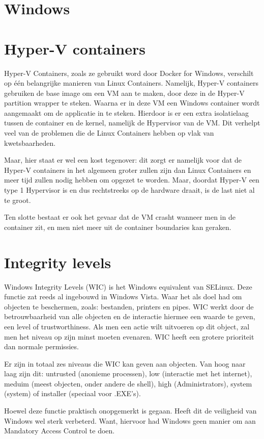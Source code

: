 \section{Windows}
\section{Hyper-V containers}
Hyper-V Containers, zoals ze gebruikt word door Docker for Windows, verschilt op één belangrijke manieren van Linux Containers. Namelijk, Hyper-V containers gebruiken de base image om een VM aan te maken, door deze in de Hyper-V partition wrapper te steken. Waarna er in deze VM een Windows container wordt aangemaakt om de applicatie in te steken. Hierdoor is er een extra isolatielaag tussen de container en de kernel, namelijk de Hypervisor van de VM. Dit verhelpt veel van de problemen die de Linux Containers hebben op vlak van kwetsbaarheden.

Maar, hier staat er wel een kost tegenover: dit zorgt er namelijk voor dat de Hyper-V containers in het algemeen groter zullen zijn dan Linux Containers en meer tijd zullen nodig hebben om opgezet te worden. Maar, doordat Hyper-V een type 1 Hypervisor is en dus rechtstreeks op de hardware draait, is de last niet al te groot.

Ten slotte bestaat er ook het gevaar dat de VM crasht wanneer men in de container zit, en men niet meer uit de container boundaries kan geraken.

\section{Integrity levels}
Windows Integrity Levels (WIC) is het Windows equivalent van SELinux. Deze functie zat reeds al ingebouwd in Windows Vista. Waar het als doel had om objecten te beschermen, zoals: bestanden, printers en pipes. WIC werkt door de betrouwbaarheid van alle objecten en de interactie hiermee een waarde te geven, een level of trustworthiness. Als men een actie wilt uitvoeren op dit object, zal men het niveau op zijn minst moeten evenaren. WIC heeft een grotere prioriteit dan normale permissies.

Er zijn in totaal zes niveaus die WIC kan geven aan objecten. Van hoog naar laag zijn dit: untrusted (anonieme processen), low (interactie met het internet), meduim (meest objecten, onder andere de shell), high (Administrators), system (system) of installer (speciaal voor .EXE's).

Hoewel deze functie praktisch onopgemerkt is gegaan. Heeft dit de veiligheid van Windows wel sterk verbeterd. Want, hiervoor had Windows geen manier om aan Mandatory Access Control te doen.

